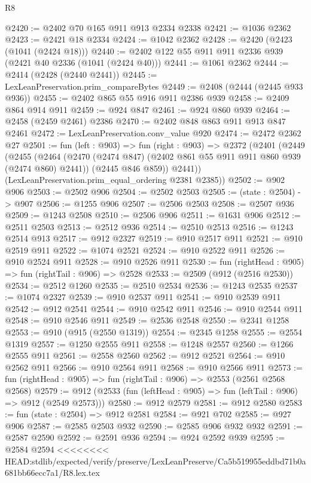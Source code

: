 \begin{lexlean}{R8}
\begin{coremodule}
{{{{{{{{{{{{{{{{{{{{{{{{{{{{{{{{{{{{{{{{{{{{{@2420 := @2402 @70 @165 @911 @913 @2334 @2338
@2421 := @1036 @2362
@2423 := @2421 @18 @2334
@2424 := @1042 @2362
@2428 := @2420 (@2423 (@1041 (@2424 @18)))
@2440 := @2402 @122 @55 @911 @911 @2336 @939 (@2421 @40 @2336 (@1041 (@2424 @40)))
@2441 := @1061 @2362
@2444 := @2414 (@2428 (@2440 @2441))
@2445 := LexLeanPreservation.prim_compareBytes
@2449 := @2408 (@2444 (@2445 @933 @936))
@2455 := @2402 @865 @55 @916 @911 @2386 @939
@2458 := @2409 @864 @914 @911
@2459 := @924 @847
@2461 := @924 @860 @939
@2464 := @2458 (@2459 @2461) @2386
@2470 := @2402 @848 @863 @911 @913 @847 @2461
@2472 := LexLeanPreservation.conv_value @920
@2474 := @2472 @2362 @27
@2501 := fun (left : @903) =>
  fun (right : @903) =>
  @2372
    (@2401
      (@2449
        (@2455
          (@2464
            (@2470 (@2474 @847) (@2402 @861 @55 @911 @911 @860 @939 (@2474 @860) @2441))
            (@2445 @846 @859))
          @2441))
      (LexLeanPreservation.prim_equal_ordering @2381 @2385))
@2502 := @902 @906
@2503 := @2502 @906
@2504 := @2502 @2503
@2505 := (state : @2504) -> @907
@2506 := @1255 @906
@2507 := @2506 @2503
@2508 := @2507 @936
@2509 := @1243 @2508
@2510 := @2506 @906
@2511 := @1631 @906
@2512 := @2511 @2503
@2513 := @2512 @936
@2514 := @2510 @2513
@2516 := @1243 @2514 @913
@2517 := @912 @2327
@2519 := @910 @2517 @911
@2521 := @910 @2519 @911
@2522 := @1074 @2521
@2524 := @910 @2522 @911
@2526 := @910 @2524 @911
@2528 := @910 @2526 @911
@2530 := fun (rightHead : @905) => fun (rightTail : @906) => @2528
@2533 := @2509 (@912 (@2516 @2530))
@2534 := @2512 @1260
@2535 := @2510 @2534
@2536 := @1243 @2535
@2537 := @1074 @2327
@2539 := @910 @2537 @911
@2541 := @910 @2539 @911
@2542 := @912 @2541
@2544 := @910 @2542 @911
@2546 := @910 @2544 @911
@2548 := @910 @2546 @911
@2549 := @2536 @2548
@2550 := @2341 @1258
@2553 := @910 (@915 (@2550 @1319))
@2554 := @2345 @1258
@2555 := @2554 @1319
@2557 := @1250 @2555 @911
@2558 := @1248 @2557
@2560 := @1266 @2555 @911
@2561 := @2558 @2560
@2562 := @912 @2521
@2564 := @910 @2562 @911
@2566 := @910 @2564 @911
@2568 := @910 @2566 @911
@2573 := fun (rightHead : @905) => fun (rightTail : @906) => @2553 (@2561 @2568 @2568)
@2579 := @912 (@2533 (fun (leftHead : @905) => fun (leftTail : @906) => @912 (@2549 @2573)))
@2580 := @912 @2579
@2581 := @912 @2580
@2583 := fun (state : @2504) => @912 @2581
@2584 := @921 @702
@2585 := @927 @906
@2587 := @2585 @2503 @932
@2590 := @2585 @906 @932 @932
@2591 := @2587 @2590
@2592 := @2591 @936
@2594 := @924 @2592 @939
@2595 := @2584 @2594
<<<<<<<< HEAD:stdlib/expected/verify/preserve/LexLeanPreserve/Ca5b519955eddbd71b0a681bb66ecc7a1/R8.lex.tex
}}}}}}}}}}}}}}}}}}}}}}}}}}}}}}}}}}}}}}}}}}}}}
\end{coremodule}
\end{lexlean}
